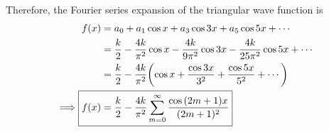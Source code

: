         Therefore, the Fourier series expansion of the triangular wave function is
        \begin{align*}
            f(x)&=a_0+a_1\cos{x}+a_3\cos{3x}+a_5\cos{5x}+\cdots \\
                &=\dfrac{k}{2}-\dfrac{4k}{\pi^2}\cos{x}-\dfrac{4k}{9\pi^2}\cos{3x}-\dfrac{4k}{25\pi^2}\cos{5x}+\cdots \\
                &=\dfrac{k}{2}-\dfrac{4k}{\pi^2}\qty(\cos{x}+\dfrac{\cos{3x}}{3^2}+\dfrac{\cos{5x}}{5^2}+\cdots) \\
            \implies\Aboxed{f(x)&=\dfrac{k}{2}-\dfrac{4k}{\pi^2}\sum_{m=0}^{\infty}{\dfrac{\cos{(2m+1)x}}{(2m+1)^2}}}
        \end{align*}



